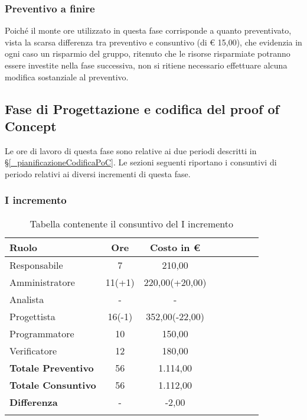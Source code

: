 \subsubsection{Preventivo a finire}
Poiché il monte ore utilizzato in questa fase corrisponde a quanto preventivato, vista la scarsa differenza tra preventivo e consuntivo (di € 15,00), che evidenzia in ogni caso un risparmio del gruppo, ritenuto che le risorse risparmiate potranno essere investite nella fase successiva, non si ritiene necessario effettuare alcuna modifica sostanziale al preventivo.



\subsection{Fase di Progettazione e codifica del proof of Concept} \label{_consuntivoPoC}
Le ore di lavoro di questa fase sono relative ai due periodi descritti in \S\ref{_pianificazioneCodificaPoC}.
Le sezioni seguenti riportano i consuntivi di periodo relativi ai diversi incrementi di questa fase.

\subsubsection{I incremento} \label{_consuntivoPoC1}
\begin{longtable}{|l|c|c|c|c|c|c|c|}
	\hline
	\rowcolor{lighter-grayer}
	\textbf{Ruolo}             & \textbf{Ore} & \textbf{Costo in €} \\
	\hline
	\endfirsthead

	\hline
	Responsabile               & 7           & 210,00              \\
	\hline
	\hline
	Amministratore             & 11(+1)       & 220,00(+20,00)      \\
	\hline
	\hline
	Analista                   & -       & -   \\
	\hline
	\hline
	Progettista                & 16(-1)            & 352,00(-22,00)              \\
	\hline
	\hline
	Programmatore              & 10            & 150,00                   \\
	\hline
	\hline
	Verificatore               & 12       & 180,00    \\
	\hline
	\textbf{Totale Preventivo} & 56          & 1.114,00            \\
	\hline
	\hline
	\textbf{Totale Consuntivo} & 56          & 1.112,00            \\
	\hline
	\hline
	\textbf{Differenza}        & -           & -2,00           \\
	\hline
	\rowcolor{white}
	\caption{Tabella contenente il consuntivo del I incremento}
\end{longtable}
